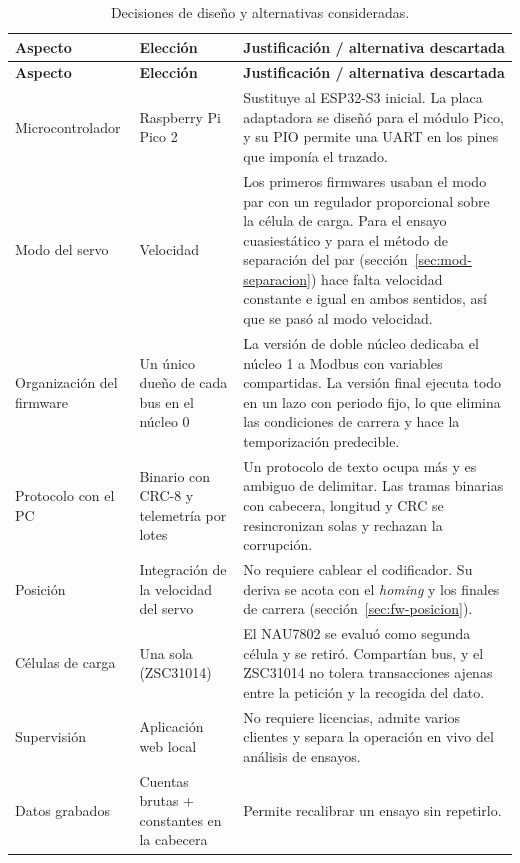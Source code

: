 \begin{longtable}{@{}L{0.19\textwidth}L{0.21\textwidth}L{0.48\textwidth}@{}}
\caption{Decisiones de diseño y alternativas consideradas.}\label{tab:decisiones}\\
\toprule
\textbf{Aspecto} & \textbf{Elección} & \textbf{Justificación / alternativa descartada} \\
\midrule
\endfirsthead
\toprule
\textbf{Aspecto} & \textbf{Elección} & \textbf{Justificación / alternativa descartada} \\
\midrule
\endhead
Microcontrolador & Raspberry Pi Pico 2 & Sustituye al ESP32-S3 inicial. La placa adaptadora se diseñó para el módulo Pico, y su PIO permite una UART en los pines que imponía el trazado. \\
Modo del servo & Velocidad & Los primeros firmwares usaban el modo par con un regulador proporcional sobre la célula de carga. Para el ensayo cuasiestático y para el método de separación del par (sección~\ref{sec:mod-separacion}) hace falta velocidad constante e igual en ambos sentidos, así que se pasó al modo velocidad. \\
Organización del firmware & Un único dueño de cada bus en el núcleo 0 & La versión de doble núcleo dedicaba el núcleo 1 a Modbus con variables compartidas. La versión final ejecuta todo en un lazo con periodo fijo, lo que elimina las condiciones de carrera y hace la temporización predecible. \\
Protocolo con el PC & Binario con CRC-8 y telemetría por lotes & Un protocolo de texto ocupa más y es ambiguo de delimitar. Las tramas binarias con cabecera, longitud y CRC se resincronizan solas y rechazan la corrupción. \\
Posición & Integración de la velocidad del servo & No requiere cablear el codificador. Su deriva se acota con el \emph{homing} y los finales de carrera (sección~\ref{sec:fw-posicion}). \\
Células de carga & Una sola (ZSC31014) & El NAU7802 se evaluó como segunda célula y se retiró. Compartían bus, y el ZSC31014 no tolera transacciones ajenas entre la petición y la recogida del dato. \\
Supervisión & Aplicación web local & No requiere licencias, admite varios clientes y separa la operación en vivo del análisis de ensayos. \\
Datos grabados & Cuentas brutas + constantes en la cabecera & Permite recalibrar un ensayo sin repetirlo. \\
\bottomrule
\end{longtable}


